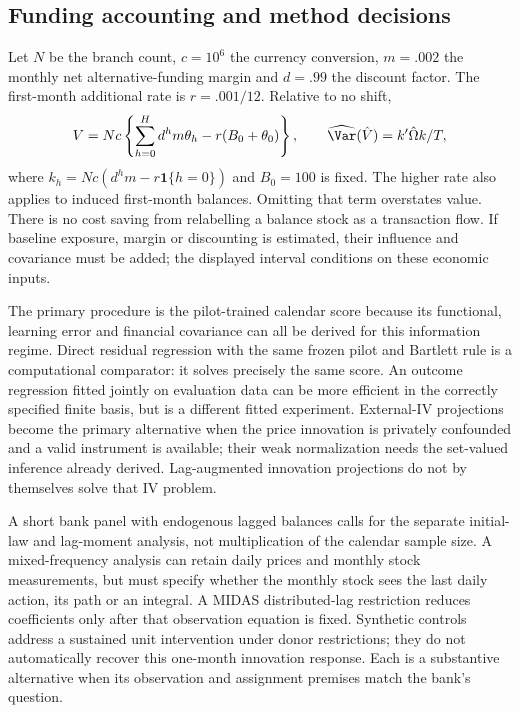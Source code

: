 \subsection{Funding accounting and method decisions}
Let $N$ be the branch count, $c=10^6$ the currency conversion, $m=.002$
the monthly net alternative-funding margin and $d=.99$ the discount factor.
The first-month additional rate is $r=.001/12$. Relative to no shift,
\begin{equation}
 V=Nc\left\{\sum_{h=0}^H d^h m\theta_h
                 -r(B_0+\theta_0)\right\},\qquad
 \widehat{\Var}(\hat V)=k'\hat\Omega k/T,
 \label{s6:funding-account}
\end{equation}
where $k_h=Nc(d^hm-r\mathbf1\{h=0\})$ and $B_0=100$ is fixed.
The higher rate also applies to induced first-month balances. Omitting that
term overstates value. There is no cost saving from relabelling a balance
stock as a transaction flow. If baseline exposure, margin or discounting is
estimated, their influence and covariance must be added; the displayed
interval conditions on these economic inputs.

The primary procedure is the pilot-trained calendar score because its
functional, learning error and financial covariance can all be derived for
this information regime. Direct residual regression with the same frozen
pilot and Bartlett rule is a computational comparator: it solves precisely
the same score. An outcome regression fitted jointly on evaluation data can
be more efficient in the correctly specified finite basis, but is a
different fitted experiment. External-IV projections become the primary
alternative when the price innovation is privately confounded and a valid
instrument is available; their weak normalization needs the set-valued
inference already derived. Lag-augmented innovation projections do not by
themselves solve that IV problem.

A short bank panel with endogenous lagged balances calls for the separate
initial-law and lag-moment analysis, not multiplication of the calendar
sample size. A mixed-frequency analysis can retain daily prices and monthly
stock measurements, but must specify whether the monthly stock sees the
last daily action, its path or an integral. A MIDAS distributed-lag
restriction reduces coefficients only after that observation equation is
fixed. Synthetic controls address a sustained unit intervention under donor
restrictions; they do not automatically recover this one-month innovation
response. Each is a substantive alternative when its observation and
assignment premises match the bank's question.

